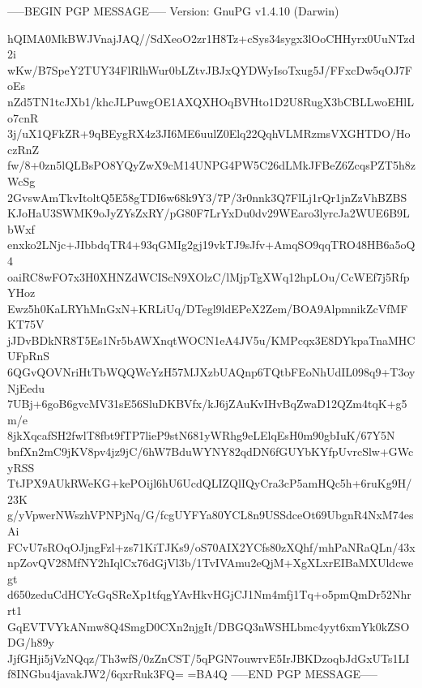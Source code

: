 -----BEGIN PGP MESSAGE-----
Version: GnuPG v1.4.10 (Darwin)

hQIMA0MkBWJVnajJAQ//SdXeoO2zr1H8Tz+cSys34sygx3lOoCHHyrx0UuNTzd2i
wKw/B7SpeY2TUY34FlRlhWur0bLZtvJBJxQYDWyIsoTxug5J/FFxcDw5qOJ7FoEs
nZd5TN1tcJXb1/khcJLPuwgOE1AXQXHOqBVHto1D2U8RugX3bCBLLwoEHlLo7cnR
3j/uX1QFkZR+9qBEygRX4z3JI6ME6uulZ0Elq22QqhVLMRzmsVXGHTDO/HoczRnZ
fw/8+0zn5lQLBsPO8YQyZwX9cM14UNPG4PW5C26dLMkJFBeZ6ZcqsPZT5h8zWcSg
2GvswAmTkvItoltQ5E58gTDI6w68k9Y3/7P/3r0nnk3Q7FlLj1rQr1jnZzVhBZBS
KJoHaU3SWMK9oJyZYsZxRY/pG80F7LrYxDu0dv29WEaro3lyrcJa2WUE6B9LbWxf
enxko2LNjc+JIbbdqTR4+93qGMIg2gj19vkTJ9sJfv+AmqSO9qqTRO48HB6a5oQ4
oaiRC8wFO7x3H0XHNZdWCIScN9XOlzC/lMjpTgXWq12hpLOu/CcWEf7j5RfpYHoz
Ewz5h0KaLRYhMnGxN+KRLiUq/DTegl9ldEPeX2Zem/BOA9AlpmnikZcVfMFKT75V
jJDvBDkNR8T5Es1Nr5bAWXnqtWOCN1eA4JV5u/KMPcqx3E8DYkpaTnaMHCUFpRnS
6QGvQOVNriHtTbWQQWcYzH57MJXzbUAQnp6TQtbFEoNhUdIL098q9+T3oyNjEedu
7UBj+6goB6gvcMV31sE56SluDKBVfx/kJ6jZAuKvIHvBqZwaD12QZm4tqK+g5m/e
8jkXqcafSH2fwlT8fbt9fTP7lieP9stN681yWRhg9eLElqEsH0m90gbIuK/67Y5N
bnfXn2mC9jKV8pv4jz9jC/6hW7BduWYNY82qdDN6fGUYbKYfpUvrcSlw+GWcyRSS
TtJPX9AUkRWeKG+kePOijl6hU6UcdQLIZQlIQyCra3cP5amHQc5h+6ruKg9H/23K
g/yVpwerNWszhVPNPjNq/G/fcgUYFYa80YCL8n9USSdceOt69UbgnR4NxM74esAi
FCvU7sROqOJjngFzl+zs71KiTJKs9/oS70AIX2YCfs80zXQhf/mhPaNRaQLn/43x
npZovQV28MfNY2hIqlCx76dGjVl3b/1TvIVAmu2eQjM+XgXLxrEIBaMXUldcwegt
d650zeduCdHCYcGqSReXp1tfqgYAvHkvHGjCJ1Nm4mfj1Tq+o5pmQmDr52Nhrrt1
GqEVTVYkANmw8Q4SmgD0CXn2njgIt/DBGQ3nWSHLbmc4yyt6xmYk0kZSODG/h89y
JjfGHji5jVzNQqz/Th3wfS/0zZnCST/5qPGN7ouwrvE5IrJBKDzoqbJdGxUTs1LI
f8INGbu4javakJW2/6qxrRuk3FQ=
=BA4Q
-----END PGP MESSAGE-----
